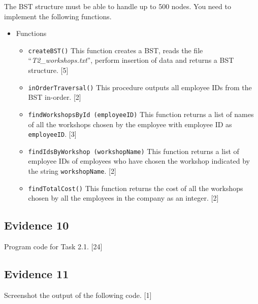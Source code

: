 The BST structure must be able to handle up to 500 nodes. You need
to implement the following functions. 
\begin{itemize}
\item Functions
\begin{itemize}
\item \texttt{createBST()} This function creates a BST, reads the file \textquotedblleft \emph{T2\_workshops.txt}\textquotedblright ,
perform insertion of data and returns a BST structure. \hfill{}{[}5{]}
\item \texttt{inOrderTraversal()} This procedure outputs all employee IDs
from the BST in-order. \hfill{}{[}2{]}
\item \texttt{findWorkshopsById (employeeID)} This function returns a list
of names of all the workshops chosen by the employee with employee
ID as \texttt{employeeID}. \hfill{}{[}3{]}
\item \texttt{findIdsByWorkshop (workshopName)} This function returns a
list of employee IDs of employees who have chosen the workshop indicated
by the string \texttt{workshopName}. \hfill{}{[}2{]}
\item \texttt{findTotalCost()} This function returns the cost of all the
workshops chosen by all the employees in the company as an integer.
\hfill{}{[}2{]}
\end{itemize}
\end{itemize}

\subsection*{Evidence 10}

Program code for Task 2.1. \hfill{}{[}24{]}

\subsection*{Evidence 11 }

Screenshot the output of the following code. \hfill{}{[}1{]}


